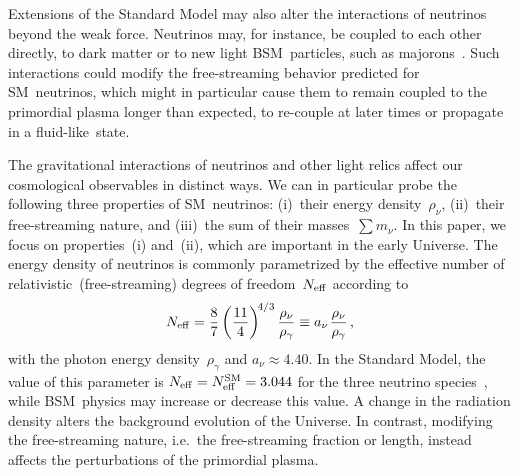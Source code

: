 Extensions of the Standard Model may also alter the interactions of neutrinos beyond the weak force. Neutrinos may, for instance, be coupled to each other directly, to dark matter or to new light BSM~particles, such as majorons~\cite{Berryman:2022hds}. Such interactions could modify the free-streaming behavior predicted for SM~neutrinos, which might in particular cause them to remain coupled to the primordial plasma longer than expected, to re-couple at later times or propagate in a fluid-like~state.\medskip

The gravitational interactions of neutrinos and other light relics affect our cosmological observables in distinct ways. We can in particular probe the following three properties of SM~neutrinos: (i)~their energy density~$\rho_\nu$, (ii)~their free-streaming nature, and (iii)~the sum of their masses~$\sum m_\nu$. In this paper, we focus on properties~(i) and~(ii), which are important in the early Universe. The energy density of neutrinos is commonly parametrized by the effective number of relativistic~(free-streaming) degrees of freedom~$N_\mathrm{eff}$ according to
\begin{equation}
	N_\mathrm{eff} = \frac{8}{7} \left(\frac{11}{4}\right)^{\!4/3} \frac{\rho_\nu}{\rho_\gamma} \equiv a_\nu\hskip1pt\frac{\rho_\nu}{\rho_\gamma}\, ,	\label{ch12-eq:Neff}
\end{equation}
with the photon energy density~$\rho_\gamma$ and $a_\nu \approx 4.40$. In the Standard Model, the value of this parameter is $N_\mathrm{eff} = N_\mathrm{eff}^\mathrm{SM} = 3.044$ for the three neutrino species~\cite{Akita:2020szl, Froustey:2020mcq, Bennett:2020zkv, Cielo:2023bqp, Drewes:2024wbw, Drewes:2024nbg}, while BSM~physics may increase or decrease this value. A change in the radiation density alters the background evolution of the Universe. In contrast, modifying the free-streaming nature, i.e.\ the free-streaming fraction or length, instead affects the perturbations of the primordial plasma.

